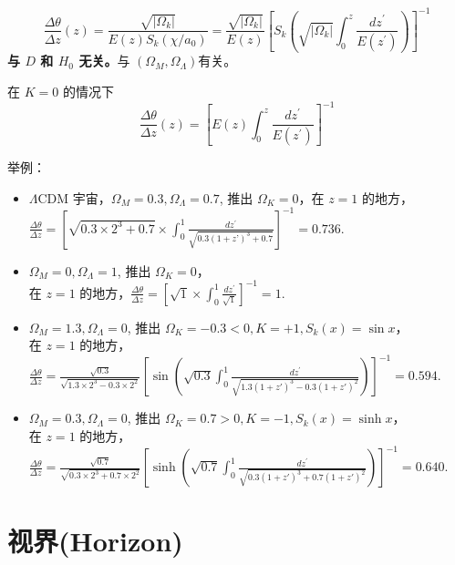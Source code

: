 \documentclass[12pt]{ctexart}
\begin{document}
\begin{equation}
    \frac{\Delta \theta}{\Delta z}(z)=\frac{\sqrt{\left|\Omega_{k}\right|}}{E(z) S_{k}\left(\chi / a_{0}\right)}=\frac{\sqrt{\left|\Omega_{k}\right|}}{E(z)}\left[S_k\left(\sqrt{\left|\Omega_{k}\right|} \int_{0}^{z} \frac{d z^{\prime}}{E\left(z^{\prime}\right)}\right)\right]^{-1}
\end{equation}
\textbf{与 $D$ 和 $ H_0$ 无关。}与 $\left(\Omega_M, \Omega_\Lambda\right) $有关。

在 $K=0$ 的情况下 
\begin{equation}
    \frac{\Delta \theta}{\Delta z}(z)= \left[E(z) \int_{0}^{z} \frac{d z^{\prime}}{E\left(z^{\prime}\right)}\right]^{-1}
\end{equation}

举例：
\begin{itemize}
    \item $\Lambda$CDM 宇宙，$\Omega_M=0.3,\Omega_\Lambda=0.7$, 推出 $\Omega_K=0$，在 $z=1$ 的地方，$\frac{\Delta \theta}{\Delta z}=\left[\sqrt{0.3 \times 2^{3}+0.7} \times \int_{0}^{1} \frac{d z^{\prime}}{\sqrt{0.3\left(1+z’\right)^{3}+0.7}}\right]^{-1}=0.736.$ 
    \item $\Omega_M=0, \Omega_\Lambda=1$, 推出 $\Omega_K=0$，\\ 在 $z=1$ 的地方，$\frac{\Delta \theta}{\Delta z}=\left[\sqrt{1} \times \int_{0}^{1} \frac{d z^{\prime}}{\sqrt{1}}\right]^{-1}=1.$ 
    \item $\Omega_M=1.3, \Omega_\Lambda=0$, 推出 $\Omega_K=-0.3<0, K=+1, S_k(x)=\sin x$，\\ 在 $z=1$ 的地方，\\$\frac{\Delta \theta}{\Delta z}=\frac{\sqrt{0.3}}{\sqrt{1.3\times 2^3-0.3\times 2^2}}\left[\sin(\sqrt{0.3}  \int_{0}^{1} \frac{d z^{\prime}}{\sqrt{1.3(1+z')^3 - 0.3 (1+z')^2}})\right]^{-1}=0.594.$  
    \item $\Omega_M=0.3, \Omega_\Lambda=0$, 推出 $\Omega_K=0.7>0, K=-1, S_k(x)=\sinh x$，\\ 在 $z=1$ 的地方，\\ $\frac{\Delta \theta}{\Delta z}=\frac{\sqrt{0.7}}{\sqrt{0.3\times 2^3 + 0.7\times 2^2}}\left[\sinh(\sqrt{0.7}  \int_{0}^{1} \frac{d z^{\prime}}{\sqrt{0.3(1+z')^3 + 0.7 (1+z')^2}})\right]^{-1}=0.640.$  
\end{itemize}

\section{视界(Horizon)}
\end{document}
